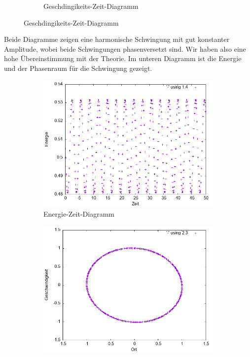 \documentclass[
    oneside,
    ngerman,
    footinclude=false,
    captions=tableheading,
    DIV=12
]{scrartcl}
\begin{document}
\begin{figure}[H]
\begin{subfigure}[b]{0.45\textwidth}
                        \caption{Geschdingikeits-Zeit-Diagramm}
                        \label{fig:expEulerA1(a)-01-0-v}
                    \end{subfigure}
               \end{figure}
               Beide Diagramme zeigen eine harmonische Schwingung mit gut konstanter Amplitude, wobei beide Schwingungen phasenversetzt sind. Wir haben also eine hohe Übereinstimmung mit der Theorie. Im unteren Diagramm ist die Energie und der Phasenraum für die Schwingung gezeigt.
               
               \begin{figure}[H]
                \centering
                \begin{subfigure}[b]{0.45\textwidth}
                    \centering
                    \includegraphics[width=\textwidth]{Bilddateien/expEulerA1(a)-01-E.png}
                    \caption{Energie-Zeit-Diagramm}
                    \label{fig:expEulerA1(a)-01-0-E}
                \end{subfigure}
                \hfill
                \begin{subfigure}[b]{0.45\textwidth}
                    \centering
                    \includegraphics[width=\textwidth]{Bilddateien/expEulerA1(a)-01-0-xv.png}

\end{subfigure}
\end{figure}
\end{document}
